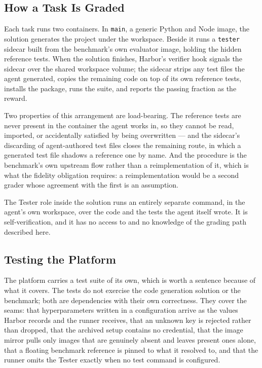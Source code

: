 
\subsection{How a Task Is Graded}

Each task runs two containers. In \texttt{main}, a generic Python and Node
image, the solution generates the project under the workspace. Beside it runs a
\texttt{tester} sidecar built from the benchmark's own evaluator image, holding
the hidden reference tests. When the solution finishes, Harbor's verifier hook
signals the sidecar over the shared workspace volume; the sidecar strips any
test files the agent generated, copies the remaining code on top of its own
reference tests, installs the package, runs the suite, and reports the passing
fraction as the reward.

Two properties of this arrangement are load-bearing. The reference tests are
never present in the container the agent works in, so they cannot be read,
imported, or accidentally satisfied by being overwritten --- and the sidecar's
discarding of agent-authored test files closes the remaining route, in which a
generated test file shadows a reference one by name. And the procedure is the
benchmark's own upstream flow rather than a reimplementation of it, which is
what the fidelity obligation requires: a reimplementation would be a second
grader whose agreement with the first is an assumption.

The Tester role inside the solution runs an entirely separate command, in the
agent's own workspace, over the code and the tests the agent itself wrote. It
is self-verification, and it has no access to and no knowledge of the grading
path described here.

\subsection{Testing the Platform}

The platform carries a test suite of its own, which is worth a sentence because
of what it covers. The tests do not exercise the code generation solution or
the benchmark; both are dependencies with their own correctness. They cover the
seams: that hyperparameters written in a configuration arrive as the values
Harbor records and the runner receives, that an unknown key is rejected rather
than dropped, that the archived setup contains no credential, that the image
mirror pulls only images that are genuinely absent and leaves present ones
alone, that a floating benchmark reference is pinned to what it resolved to,
and that the runner omits the Tester exactly when no test command is
configured.

